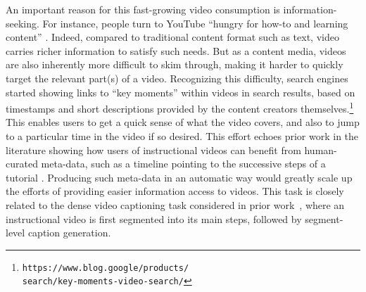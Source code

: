 \documentclass[11pt,a4paper]{article}
\newcommand{\breakableurl}[1]{\texttt{#1}}
\begin{document}
An important reason for this fast-growing video consumption is information-seeking.
For instance, people turn to YouTube ``hungry for how-to and learning content'' \cite{oneilhart2018}.
Indeed, compared to traditional content format such as text, video carries richer information to satisfy such needs.
But as a content media, videos are also inherently more difficult to skim through, making it harder to quickly target the relevant part(s) of a video.
Recognizing this difficulty, search engines started showing links to ``key moments'' within videos in search results, based on timestamps and short descriptions provided by the content creators themselves.\footnote{\breakableurl{https://www.blog.google/products/\\search/key-moments-video-search/}}
This enables users to get a quick sense of what the video covers, and also to jump to a particular time in the video if so desired.
This effort echoes prior work in the literature showing how users of instructional videos can benefit from human-curated meta-data, such as a timeline pointing to the successive steps of a tutorial \cite{kim2014crowdsourcing,margulieux2012subgoal,weir2015learnersourcing}.
Producing such meta-data in an automatic way would greatly scale up the efforts of providing easier information access to videos.
This task is closely related to the dense video captioning task considered in prior work~\cite{zhou2018towards,Zhou2018EndtoEndDV,krishna2017densecaptioning}, where an instructional video is first segmented into its main steps, followed by segment-level caption generation. 
\end{document}
